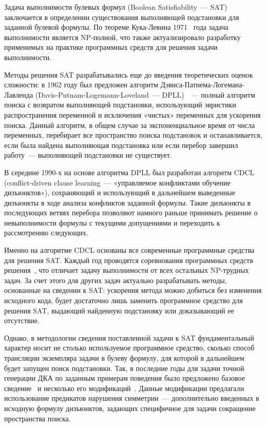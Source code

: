 Задача выполнимости булевых формул (Boolean Satisfiability~--- SAT) заключается в определении существования выполняющей подстановки для заданной булевой формулы.
По теореме Кука-Левина 1971~\cite{cook-satnp-71,levin-satnp-73} года задача выполнимости является NP-полной, что также актуализировало разработку применимых на практике программных средств для решения задачи выполнимости.

Методы решения SAT разрабатывались еще до введения теоретических оценок сложности: в 1962 году был предложен алгоритм Дэвиса-Патнема-Логемана-Лавленда (Davis-Putnam-Logemann-Loveland~--- DPLL)~\cite{DBLP:journals/cacm/DavisLL62}~--- полный алгоритм поиска с возвратом выполняющей подстановки, использующий эвристики распространения переменной и исключения «чистых» переменных для ускорения поиска.
Данный алгоритм, в общем случае за экспоненциальное время от числа переменных, перебирает все пространство поиска подстановок и останавливается, если была найдена выполняющая подстановка или если перебор завершил работу~--- выполняющей подстановки не существует. 

В середине 1990-х на основе алгоритма DPLL был разработан алгоритм CDCL~\cite{DBLP:conf/iccad/SilvaS96} (conflict-driven clause learning~--- «управляемое конфликтами обучение дизъюнктов»), сохраняющий  и использующий в дальнейшем выведенные дизъюнкты в ходе анализа конфликтов заданной формулы.
Такие дизъюнкты в последующих ветвях перебора позволяют намного раньше принимать решение о невыполнимости формулы с текущими допущениями и переходить к рассмотрению следующих.

Именно на алгоритме CDCL основаны все современные программные средства для решения SAT.
Каждый год проводятся соревнования программных средств решения~\cite{sat-competitions,sat-competition-2020}, что отличает задачу выполнимости от всех остальных NP-трудных задач.
За счет этого для других задач актуально разрабатывать методы, основанные на сведении к SAT: ускорения метода можно добиться без изменения исходного кода, будет достаточно лишь заменить программное средство для решения SAT, выдающий найденную подстановку или доказывающий ее отсутствие.

Однако, в методологии сведения поставленной задачи к SAT фундаментальный характер носит не столько используемое программное средство, сколько способ трансляции экземпляра задачи в булеву формулу, для которой в дальнейшем будет запущен поиск подстановки.
Так, в последние годы для задачи точной генерации ДКА по заданным примерам поведения было предложено базовое сведение~\cite{heule-icgi10} и несколько его модификаций~\cite{DBLP:journals/ese/HeuleV13,ulyantsev-phd-13}.
Данные модификации предлагали использование предикатов нарушения симметрии~--- дополнительно введенных в исходную формулу дизъюнктов, задающих специфичное для задачи сокращение пространства поиска.

